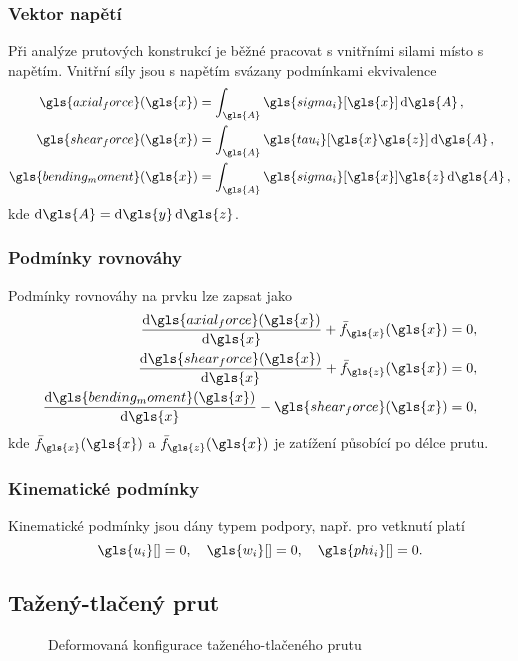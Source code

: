 \subsubsection*{Vektor napětí}

Při analýze prutových konstrukcí je běžné pracovat s vnitřními silami místo s napětím. Vnitřní síly jsou s napětím svázany podmínkami ekvivalence
\begin{align}
    \gls{axial_force}(\gls{x}) &= \int_{\gls{A}} \gls{sigma_i}[\gls{x}] \dd{\gls{A}}, \label{eq:N}\\
    \gls{shear_force}(\gls{x}) &= \int_{\gls{A}} \gls{tau_i}[\gls{x}\gls{z}] \dd{\gls{A}}, \label{eq:V}\\
    \gls{bending_moment}(\gls{x}) &= \int_{\gls{A}} \gls{sigma_i}[\gls{x}] \gls{z} \dd{\gls{A}}, \label{eq:M}
\end{align}
kde $\dd{\gls{A}} = \dd{\gls{y}}\dd{\gls{z}}$.

\subsubsection*{Podmínky rovnováhy}
Podmínky rovnováhy na prvku lze zapsat jako
\begin{align}
    \dv{\gls{axial_force}(\gls{x})}{\gls{x}} + \bar{f}_{\gls{x}}(\gls{x}) &= 0, \\
    \dv{\gls{shear_force}(\gls{x})}{\gls{x}} + \bar{f}_{\gls{z}}(\gls{x}) &= 0, \label{eq:V_equilibrium}\\
    \dv{\gls{bending_moment}(\gls{x})}{\gls{x}} - \gls{shear_force}(\gls{x}) &= 0, \label{eq:M_equilibrium}
\end{align}
kde $\bar{f}_{\gls{x}}(\gls{x})$ a $\bar{f}_{\gls{z}}(\gls{x})$ je zatížení působící po délce prutu.

\subsubsection*{Kinematické podmínky}
Kinematické podmínky jsou dány typem podpory, např. pro vetknutí platí
\begin{equation}
    \gls{u_i}[ ] = 0, \quad \gls{w_i}[ ] = 0, \quad \gls{phi_i}[ ] = 0.
\end{equation}

\subsection{Tažený-tlačený prut}

\begin{figure}[H]
    
    \caption{Deformovaná konfigurace taženého-tlačeného prutu}
    \label{fig:deformed_bar}
\end{figure}

